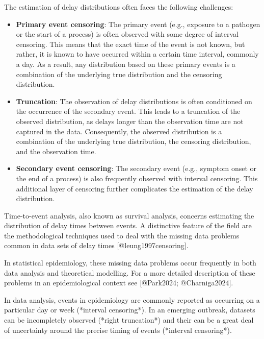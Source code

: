 \documentclass[10pt,letterpaper]{article}
\begin{document}
The estimation of delay distributions often faces the following challenges:

\begin{itemize}
    \item \textbf{Primary event censoring}: The primary event (e.g., exposure to a pathogen or the start of a process) is often observed with some degree of interval censoring. This means that the exact time of the event is not known, but rather, it is known to have occurred within a certain time interval, commonly a day. As a result, any distribution based on these primary events is a combination of the underlying true distribution and the censoring distribution.
    
    \item \textbf{Truncation}: The observation of delay distributions is often conditioned on the occurrence of the secondary event. This leads to a truncation of the observed distribution, as delays longer than the observation time are not captured in the data. Consequently, the observed distribution is a combination of the underlying true distribution, the censoring distribution, and the observation time.
    
    \item \textbf{Secondary event censoring}: The secondary event (e.g., symptom onset or the end of a process) is also frequently observed with interval censoring. This additional layer of censoring further complicates the estimation of the delay distribution.
    
\end{itemize}

Time-to-event analysis, also known as survival analysis, concerns estimating the distribution of delay times between events. A distinctive feature of the field are the methodological techniques used to deal with the missing data problems common in data sets of delay times [@leung1997censoring].

In statistical epidemiology, these missing data problems occur frequently in both data analysis and theoretical modelling. For a more detailed description of these problems in an epidemiological context see [@Park2024; @Charniga2024].

In data analysis, events in epidemiology are commonly reported as occurring on a particular day or week (*interval censoring*). In an emerging outbreak, datasets can be incompletely observed (*right truncation*) and their can be a great deal of uncertainty around the precise timing of events (*interval censoring*).
\end{document}
